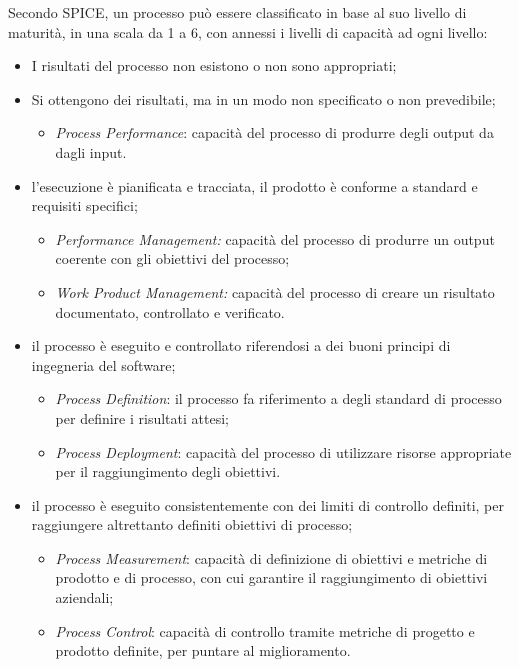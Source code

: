 Secondo SPICE, un processo può essere classificato in base al suo livello di maturità, in una scala da 1 a 6, con annessi i livelli di capacità ad ogni livello:
\begin{itemize}
    \item {} I risultati del processo non esistono o non sono appropriati;
    \item {} Si ottengono dei risultati, ma in un modo non specificato o non prevedibile;
    \begin{itemize}
        \item \emph{Process Performance}: capacità del processo di produrre degli output da dagli input.
    \end{itemize}
    \item  {} l'esecuzione è pianificata e tracciata, il prodotto è conforme a standard e requisiti specifici;
    \begin{itemize}
            \item \emph{Performance Management:} capacità del processo di produrre un output coerente con gli obiettivi del processo;
             \item \emph{Work Product Management:} capacità del processo di creare un risultato documentato, controllato e verificato.
    \end{itemize}
    \item  {} il processo è eseguito e controllato riferendosi a dei buoni principi di ingegneria del software;
    \begin{itemize}
    	\item \emph{Process Definition}: il processo fa riferimento a degli standard di processo per definire i risultati attesi;
    	\item \emph{Process Deployment}: capacità del processo di utilizzare risorse appropriate per il raggiungimento degli obiettivi.
    \end{itemize}
     \item  {}  il processo è eseguito consistentemente con dei limiti di controllo definiti, per raggiungere altrettanto definiti obiettivi di processo;
        \begin{itemize}
        	\item \emph{Process Measurement}: capacità di definizione di obiettivi e metriche di prodotto e di processo, con cui garantire il raggiungimento di obiettivi aziendali;
        	\item \emph{Process Control}: capacità di controllo tramite metriche di progetto e prodotto definite, per puntare al miglioramento.

\end{itemize}
\end{itemize}
